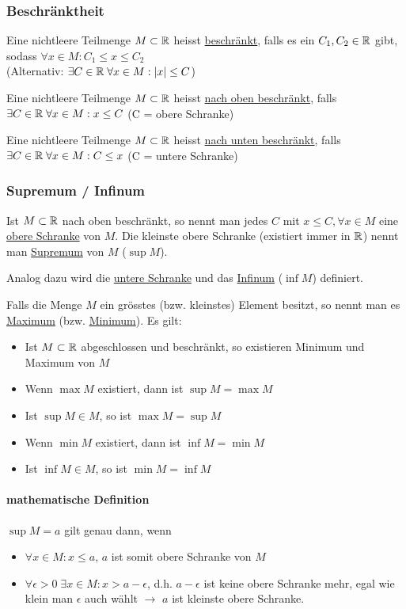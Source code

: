 \subsubsection{Beschränktheit}
Eine nichtleere Teilmenge $M \subset \mathbb{R}$ heisst \underline{beschränkt}, falls es ein $C_1, C_2 \in \mathbb{R}$ gibt, sodass 
$\forall x \in M: C_1 \leq x \leq C_2$\\
(Alternativ: $\exists C \in \mathbb{R} \; \forall x \in M: |x| \leq C$)

\vspace{2pt}Eine nichtleere Teilmenge $M \subset \mathbb{R}$ heisst \underline{nach oben beschränkt}, falls 
$\exists C \in \mathbb{R} \; \forall x \in M: x \leq C$ \hspace{3pt} (C = obere Schranke)

\vspace{2pt}Eine nichtleere Teilmenge $M \subset \mathbb{R}$ heisst \underline{nach unten beschränkt}, falls 
$\exists C \in \mathbb{R} \; \forall x \in M: C \leq x$ \hspace{3pt} (C = untere Schranke)

\subsubsection{Supremum / Infinum}
Ist $M \subset \mathbb{R}$ nach oben beschränkt, so nennt man jedes $C$ mit $x \leq C, \forall x \in M$
eine \underline{obere Schranke} von $M$. Die kleinste obere Schranke (existiert immer in $\mathbb{R}$) nennt man \underline{Supremum} von $M$ ($\sup M$).

Analog dazu wird die \underline{untere Schranke} und das \underline{Infinum} ($\inf M$) definiert.

Falls die Menge $M$ ein grösstes (bzw. kleinstes) Element besitzt, so nennt man es \underline{Maximum} (bzw. \underline{Minimum}).
Es gilt:
\begin{itemize}
	\item Ist $M \subset \mathbb{R}$ abgeschlossen und beschränkt, so existieren Minimum und Maximum von $M$
	\item Wenn $\max M$ existiert, dann ist $\sup M = \max M$
	\item Ist $\sup M \in M$, so ist $\max M = \sup M$
	\item Wenn $\min M$ existiert, dann ist $\inf M = \min M$
	\item Ist $\inf M \in M$, so ist $\min M = \inf M$
\end{itemize}

\paragraph{mathematische Definition}
$\sup M = a$ gilt genau dann, wenn
\begin{itemize}
	\item $\forall x \in M: x \leq a$, $a$ ist somit obere Schranke von $M$
	\item $\forall \epsilon > 0 \; \exists x \in M: x > a - \epsilon$, d.h. $a - \epsilon$ ist keine obere Schranke mehr, egal wie klein man $\epsilon$ auch wählt $\rightarrow$ $a$ ist kleinste obere Schranke.
\end{itemize}


